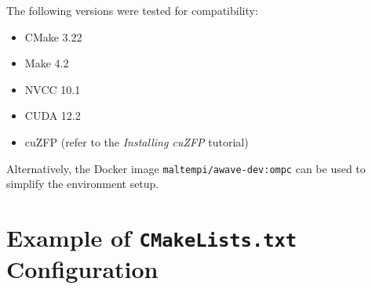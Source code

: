\documentclass[Ingles]{ic-tese-v3}
\begin{document}
The following versions were tested for compatibility:

\begin{itemize}
    \item CMake 3.22
    \item Make 4.2
    \item NVCC 10.1
    \item CUDA 12.2
    \item cuZFP (refer to the \textit{Installing cuZFP} tutorial)
\end{itemize}

Alternatively, the Docker image \texttt{maltempi/awave-dev:ompc} can be used to simplify the environment setup.

\section{Example of \texttt{CMakeLists.txt} Configuration}
\end{document}

